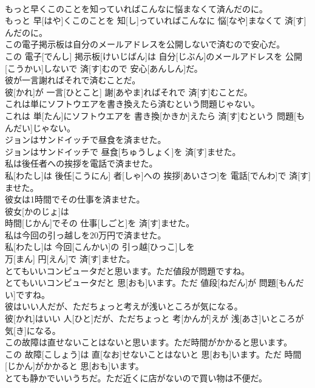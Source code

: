 \documentclass[8pt]{extreport}
\begin{document}
\begin{CJK}{UTF8}{min}
\\	もっと早くこのことを知っていればこんなに悩まなくて済んだのに。	
\\	もっと 早[はや]くこのことを 知[し]っていればこんなに 悩[なや]まなくて 済[す]んだのに。
\\	この電子掲示板は自分のメールアドレスを公開しないで済むので安心だ。	
\\	この 電子[でんし] 掲示板[けいじばん]は 自分[じぶん]のメールアドレスを 公開[こうかい]しないで 済[す]むので 安心[あんしん]だ。
\\	彼が一言謝ればそれで済むことだ。	
\\	彼[かれ]が 一言[ひとこと] 謝[あやま]ればそれで 済[す]むことだ。
\\	これは単にソフトウエアを書き換えたら済むという問題じゃない。	
\\	これは 単[たん]にソフトウエアを 書き換[かきか]えたら 済[す]むという 問題[もんだい]じゃない。
\\	ジョンはサンドイッチで昼食を済ませた。	
\\	ジョンはサンドイッチで 昼食[ちゅうしょく]を 済[す]ませた。
\\	私は後任者への挨拶を電話で済ませた。	
\\	私[わたし]は 後任[こうにん] 者[しゃ]への 挨拶[あいさつ]を 電話[でんわ]で 済[す]ませた。
\\	彼女は1時間でその仕事を済ませた。	
\\	彼女[かのじょ]は 
\\	時間[じかん]でその 仕事[しごと]を 済[す]ませた。
\\	私は今回の引っ越しを20万円で済ませた。	
\\	私[わたし]は 今回[こんかい]の 引っ越[ひっこ]しを 
\\	万[まん] 円[えん]で 済[す]ませた。
\\	とてもいいコンピュータだと思います。ただ値段が問題ですね。	
\\	とてもいいコンピュータだと 思[おも]います。ただ 値段[ねだん]が 問題[もんだい]ですね。
\\	彼はいい人だが、ただちょっと考えが浅いところが気になる。	
\\	彼[かれ]はいい 人[ひと]だが、ただちょっと 考[かんが]えが 浅[あさ]いところが 気[き]になる。
\\	この故障は直せないことはないと思います。ただ時間がかかると思います。	
\\	この 故障[こしょう]は 直[なお]せないことはないと 思[おも]います。ただ 時間[じかん]がかかると 思[おも]います。
\\	とても静かでいいうちだ。ただ近くに店がないので買い物は不便だ。	

\end{CJK}
\end{document}
